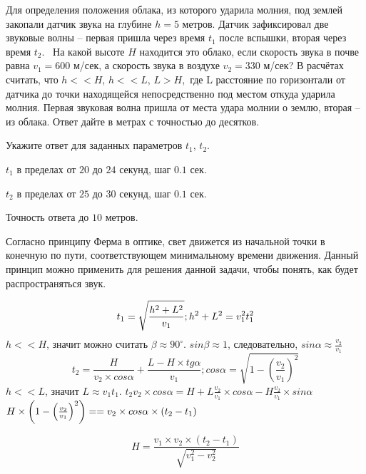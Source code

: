 
Для определения положения облака, из которого ударила
молния, под землей закопали датчик звука на глубине $h=5$ метров. Датчик 
зафиксировал две звуковые волны – первая пришла через время $t_1$ после
вспышки, вторая через время $t_2$.  На какой
высоте $H$ находится это облако,
если скорость звука в почве равна \linebreak $v_1 = 600$ м/сек, а скорость
звука в воздухе $v_2 = 330$ м/сек? В расчётах
считать, что $h << H$, $h << L$, $L >  H$, где L расстояние по горизонтали от датчика до точки находящейся непосредственно под местом откуда ударила молния. Первая
звуковая волна пришла от места удара молнии о землю, вторая – из облака. Ответ дайте в метрах с точностью до десятков.


Укажите ответ для заданных параметров $ t_1$, $t_2$.

\paramSection

$t_1$ в пределах от $20$ до $24$ секунд, шаг  $0.1$ сек.  

$t_2$ в пределах от $25$ до $30$ секунд, шаг  $0.1$ сек.

Точность ответа  до $10$ метров.

\solutionSection

Согласно принципу Ферма в оптике, свет движется из начальной точки в конечную по пути, 
соответствующем минимальному времени движения. Данный принцип можно применить для решения данной задачи, 
чтобы понять, как будет распространяться звук.

$$t_1=\sqrt{\frac{h^2+L^2}{v_1}}; \space h^2+L^2=v_1^2 t_1^2$$
$h<<H$, значит можно считать $\beta  \approx 90^{\circ}$. $sin\beta  \approx 1$, следовательно,  
$sin \alpha  \approx \frac{v_2}{v_1}$ 
$$t_2=\frac{H}{v_2  \times cos \alpha}+\frac{L-H \times tg \alpha }{v_1}; 
cos \alpha =\sqrt{1-\left(\frac{v_2}{v_1}\right)^2}$$
$h<<L$, значит $L \approx v_1 t_1$. $t_2 v_2 \times cos \alpha =H+L \frac{v_2}{v_1} \times cos \alpha -H \frac{v_2}{v_1} \times sin \alpha$  
$H \times \left(1-\left(\frac{v_2}{v_1} \right)^2 \right)= \linebreak = v_2 \times cos \alpha  \times (t_2-t_1 )$

$$H=\frac{v_1 \times v_2 \times (t_2-t_1 )}{\sqrt{v_1^2-v_2^2}}$$

